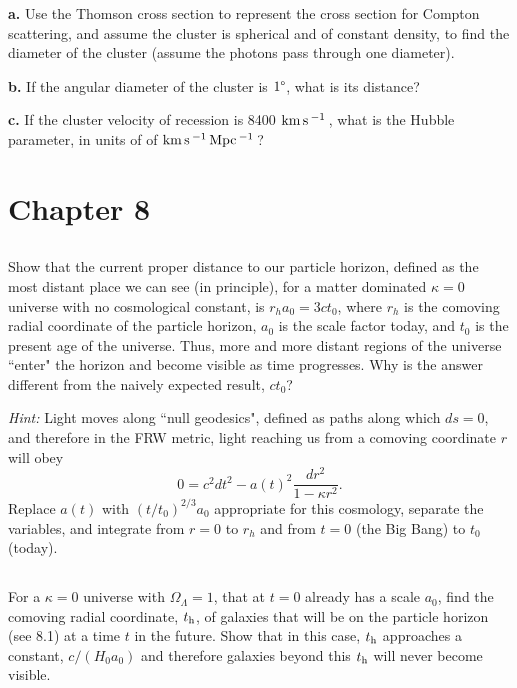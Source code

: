 \documentclass[12pt]{article}
\begin{document}
\textbf{a.} Use the Thomson cross section to represent the cross section for Compton scattering, and assume the cluster is spherical and of constant density, to find the diameter of the cluster (assume the photons pass through one diameter).

\textbf{b.} If the angular diameter of the cluster is \(1 \degree\), what is its distance?

\textbf{c.} If the cluster velocity of recession is 8400 \(\mathrm{km\,}\mathrm{s}\,^{-1}\,\), what is the Hubble parameter, in units of of \(\mathrm{km\,}\mathrm{s}\,^{-1}\,\mathrm{Mpc}\,^{-1}\,\)?

\setcounter{section}{8}
\setcounter{subsection}{0}

\section*{Chapter 8}

\subsection{} %

Show that the current proper distance to our particle horizon, defined as the most distant place we can see (in principle), for a matter dominated \(\kappa=0\) universe with no cosmological constant, is \(r_h a_0 = 3ct_0\), where \(r_h\) is the comoving radial coordinate of the particle horizon, \(a_0\) is the scale factor today, and \(t_0\) is the present age of the universe. Thus, more and more distant regions of the universe ``enter" the horizon and become visible as time progresses. Why is the answer different from the naively expected result, \(ct_0\)?

\textit{Hint:} Light moves along ``null geodesics", defined as paths along which \(ds = 0\), and therefore in the FRW metric, light reaching us from a comoving coordinate \(r\) will obey
\[0 = c^2dt^2-a(t)^2\frac{dr^2}{1-\kappa r^2}.
\]
Replace \(a(t)\) with \( (t/t_0)^{2/3}a_0\) appropriate for this cosmology, separate the variables, and integrate from \(r=0\) to \(r_h\) and from \(t=0\) (the Big Bang) to \(t_0\) (today).

\subsection{} %

For a \(\kappa=0\) universe with \(\Omega_\Lambda = 1\), that at \(t=0\) already has a scale \(a_0\), find the comoving radial coordinate, \(t_\mathrm{h}\), of galaxies that will be on the particle horizon (see 8.1) at a time \(t\) in the future. Show that in this case, \(t_\mathrm{h}\) approaches a constant, \(c/(H_0a_0)\) and therefore galaxies beyond this \(t_\mathrm{h}\) will never become visible.
\end{document}
